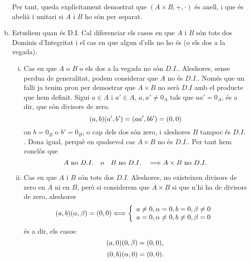 \documentclass[../main.tex]{subfiles}
\begin{document}
\begin{enumerate}[(a)]
    Per tant, queda explícitament demostrat que $(A\times B,+,\cdotp)$ és anell, i que és abelià i unitari si $A$ i $B$ ho són per separat.
    
    \item Estudiem quan és D.I. Cal diferenciar els casos en que $A$ i $B$ són tots dos Dominis d'Integritat i el cas en que algun d'ells no ho és (o els dos a la vegada).
    \begin{enumerate}[(i)]
        \item Cas en que $A$ o $B$ o els dos a la vegada no són $D.I.$. Aleshores, sense perdua de generalitat, podem considerar que $A$ no és $D.I.$. Només que un falli ja tenim prou per demostrar que $A\times B$ no serà $D.I$ amb el producte que hem definit. Sigui $a\in A$ i $a'\in A$, $a,a'\not=0_A$ tals que $aa'=0_A$, és a dir, que són divisors de zero.
        \begin{equation}
            \notag
            (a,b)(a',b') = (aa',bb')=(0,0)
        \end{equation}
        on $b=0_B$ o $b'=0_B$, o cap dels dos són zero, i aleshores $B$ tampoc és $D.I.$. Dona igual, perquè en qualsevol cas $A\times B$ no és $D.I.$. Per tant hem conclòs que 
        \begin{equation}
            \notag
            A\text{ no } D.I. \quad o \quad B\text{ no }D.I. \quad \Longrightarrow A\times B \text{ no } D.I.
        \end{equation}
        
        \item Cas en que $A$ i $B$ són tots dos $D.I.$ Aleshores, no existeixen divisors de zero en $A$ ni en $B$, però si considerem que $A\times B$ si que n'hi ha de divisors de zero, aleshores
        \begin{equation}
            \notag
            (a,b)(\alpha,\beta)=(0,0) \Longleftrightarrow 
            \left\{
            \begin{array}{ll}
                 a \not= 0, \alpha=0, b=0,\beta\not=0 \\
                 a=0,\alpha \not=0, b\not=0,\beta=0
            \end{array}
            \right.
        \end{equation}
        és a dir, els casos:
        \begin{equation}
            \notag
            (a,0)(0,\beta)=(0,0),
        \end{equation}
        \begin{equation}
            \notag
            (0,b)(\alpha,0)=(0,0).
        \end{equation}
        

\end{enumerate}
\end{enumerate}
\end{document}
